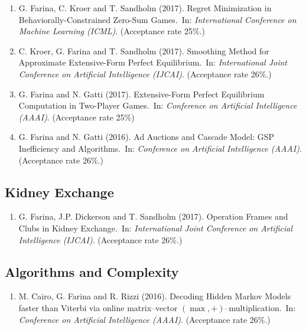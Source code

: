 \documentclass[10PT,letter]{article}
\newcounter{papercnt}
\newcommand{\subsectionstyle}[1]{\normalfont\selectfont\textcolor{titlecol}{\sffamily #1}}
\newcommand{\newl}{~}
\begin{document}
\begin{enumerate}[itemsep=.5mm]
            \item G. Farina, C. Kroer and T. Sandholm (2017). Regret Minimization in Behaviorally-Constrained Zero-Sum Games.\newl In: \textit{International Conference on Machine Learning (ICML)}.  (Acceptance rate 25\%.)
            
            \item C. Kroer, G. Farina and T. Sandholm (2017). Smoothing Method for Approximate Extensive-Form Perfect Equilibrium.\newl In: \textit{International Joint Conference on Artificial Intelligence (IJCAI)}. (Acceptance rate 26\%.)
            
            \item G. Farina and N. Gatti (2017). Extensive-Form Perfect Equilibrium Computation in Two-Player Games.\newl In: \textit{Conference on Artificial Intelligence (AAAI)}. (Acceptance rate 25\%)
            
            \item G. Farina and N. Gatti (2016). Ad Auctions and Cascade Model: GSP Inefficiency and Algorithms.\newl In: \textit{Conference on Artificial Intelligence (AAAI)}. (Acceptance rate 26\%.)
        \end{enumerate}
        \setcounter{papercnt}{\value{enumi}}
            
        \subsection*{\subsectionstyle{Kidney Exchange}}
            \begin{enumerate}[itemsep=.5mm]
                \setcounter{enumi}{\value{papercnt}}
                \item G. Farina, J.P. Dickerson and T. Sandholm (2017). Operation Frames and Clubs in Kidney Exchange.\newl In: \textit{International Joint Conference on Artificial Intelligence (IJCAI)}. (Acceptance rate 26\%.)
            \end{enumerate}
            \setcounter{papercnt}{\value{enumi}}
            
        \subsection*{\subsectionstyle{Algorithms and Complexity}}
           \begin{enumerate}[itemsep=.5mm]
                \setcounter{enumi}{\value{papercnt}}
                \item M. Cairo, G. Farina and R. Rizzi (2016). Decoding Hidden Markov Models faster than Viterbi via online matrix--vector $(\max, +)$--multiplication.\newl In: \textit{Conference on Artificial Intelligence (AAAI)}. (Acceptance rate 26\%.)
            \end{enumerate}
            \setcounter{papercnt}{\value{enumi}}
                    
\end{document}

